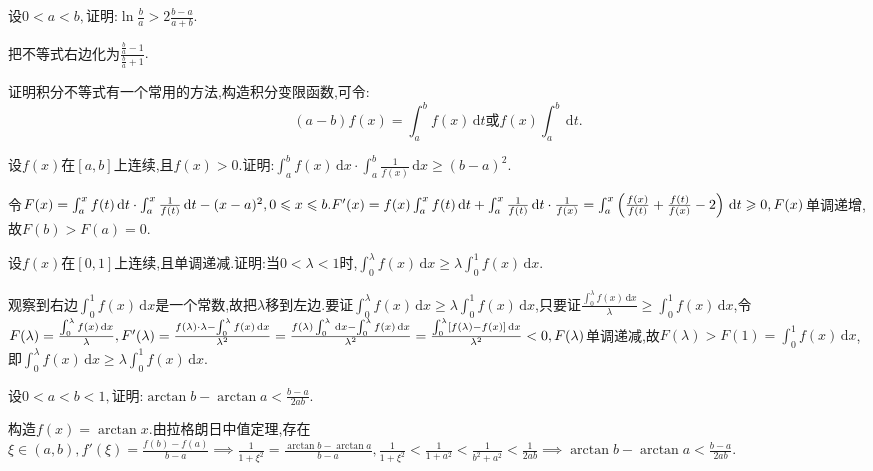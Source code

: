 \begin{examp}{设$0<a<b,$证明:$\ln \frac{b}{a}>2\frac{b-a}{a+b}.$}
    \par \jie 把不等式右边化为$\frac{\frac{b}{a}-1}{\frac{b}{a}+1}.$
\end{examp}
证明积分不等式有一个常用的方法,构造积分变限函数,可令:
\begin{equation*}
    (a-b)f(x)=\int_{a}^{b} f(x) \,\mathrm{d}t \text{或} f(x)\int_{a}^{b}  \,\mathrm{d}t .
\end{equation*}
\begin{examp}{设$f(x)$在$[a,b]$上连续,且$f(x)>0$.证明:$\int_{a}^{b} f(x) \,\mathrm{d}x \cdot \int_{a}^{b} \frac{1}{f(x)} \,\mathrm{d}x \geqslant (b-a)^2.$}
    \par \zheng 令$F(x)=\int_{a}^{x} f(t) \,\mathrm{d}t \cdot \int_{a}^{x} \frac{1}{f(t)} \,\mathrm{d}t -(x-a)^2, 0 \leqslant x \leqslant b. \\
    F'(x)=f(x)\int_{a}^{x} f(t) \,\mathrm{d}t +\int_{a}^{x} \frac{1}{f(t)} \,\mathrm{d}t \cdot \frac{1}{f(x)} =\int_{a}^{x} \left( \frac{f(x)}{f(t)}+\frac{f(t)}{f(x)}-2 \right) \,\mathrm{d}t \geqslant 0,\\
    F(x)$单调递增,故$F(b)> F(a)=0$.
\end{examp}
\begin{examp}{设$f(x)$在$[0,1]$上连续,且单调递减.证明:当$0<\lambda<1$时,$\int_{0}^{\lambda} f(x) \,\mathrm{d}x \geqslant \lambda \int_{0}^{1} f(x) \,\mathrm{d}x .$}
    \par \zheng 观察到右边$\int_{0}^{1} f(x) \,\mathrm{d}x $是一个常数,故把$\lambda$移到左边.要证$\int_{0}^{\lambda} f(x) \,\mathrm{d}x \geqslant \lambda \int_{0}^{1} f(x) \,\mathrm{d}x $,只要证$\frac{\int_{0}^{\lambda} f(x) \,\mathrm{d}x }{\lambda}\geqslant \int_{0}^{1} f(x) \,\mathrm{d}x $,令$F(\lambda)=\frac{\int_{0}^{\lambda} f(x) \,\mathrm{d}x }{\lambda},\\ 
    F'(\lambda)=\frac{f(\lambda)\cdot \lambda-\int_{0}^{\lambda} f(x) \,\mathrm{d}x }{\lambda^2}=\frac{f(\lambda)\int_{0}^{\lambda}  \,\mathrm{d}x -\int_{0}^{\lambda} f(x) \,\mathrm{d}x }{\lambda^2}=\frac{\int_{0}^{\lambda} [f(\lambda)-f(x)] \,\mathrm{d}x }{\lambda^2}<0,\\
    F(\lambda)$单调递减,故$F(\lambda) > F(1) = \int_{0}^{1} f(x) \,\mathrm{d}x $,即$\int_{0}^{\lambda} f(x) \,\mathrm{d}x \geqslant \lambda \int_{0}^{1} f(x) \,\mathrm{d}x .$
\end{examp}
\begin{examp}{设$0<a<b<1,$证明:$\arctan b-\arctan a<\frac{b-a}{2ab}.$}
    \par \zheng 构造$f(x)=\arctan x.$由拉格朗日中值定理,存在$\xi \in (a,b),f'(\xi)=\frac{f(b)-f(a)}{b-a}\implies \frac{1}{1+\xi^2}=\frac{\arctan b-\arctan a}{b-a},\frac{1}{1+\xi^2}<\frac{1}{1+a^2}<\frac{1}{b^2+a^2}<\frac{1}{2ab}\implies \arctan b-\arctan a<\frac{b-a}{2ab}.$
\end{examp}


